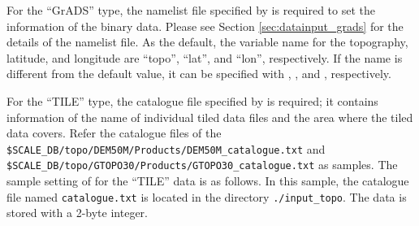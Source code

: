 For the ``GrADS'' type, the namelist file specified by  is required to set the information of the \grads binary data.
Please see Section \ref{sec:datainput_grads} for the details of the namelist file.
As the default, the variable name for the topography, latitude, and longitude are ``topo'', ``lat'', and ``lon'', respectively.
If the name is different from the default value, it can be specified with , , and , respectively.


For the ``TILE'' type, the catalogue file specified by  is required;
it contains information of the name of individual tiled data files and the area where the tiled data covers.
Refer the catalogue files of the \verb|$SCALE_DB/topo/DEM50M/Products/DEM50M_catalogue.txt| and \\
\verb|$SCALE_DB/topo/GTOPO30/Products/GTOPO30_catalogue.txt| as samples.
The sample setting of  for the ``TILE'' data is as follows.
In this sample, the catalogue file named \verb|catalogue.txt| is located in the directory \verb|./input_topo|.
The data is stored with a 2-byte integer.
